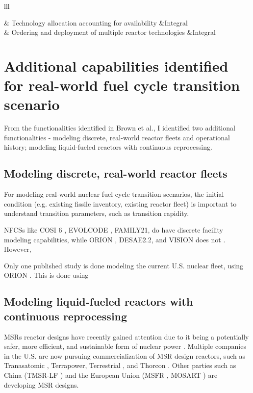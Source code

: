 \begin{table}[h]
\begin{tabular}{lll}
        \hline

         & Technology allocation accounting for availability &Integral \\
        	& Ordering and deployment of multiple reactor technologies &Integral \\
        \hline
    \end{tabular}
\end{table}

\section{Additional capabilities identified for real-world fuel cycle transition scenario}
From the functionalities identified in Brown et al., I identified two additional functionalities -
modeling discrete, real-world reactor fleets and operational history; modeling liquid-fueled
reactors with continuous reprocessing.

\subsection{Modeling discrete, real-world reactor fleets}
For modeling real-world nuclear fuel cycle transition scenarios, the initial
condition (e.g. existing fissile inventory, existing reactor fleet) is important
to understand transition parameters, such as transition rapidity.

\glspl{NFCS} like COSI 6 \cite{meyer_new_2009}, EVOLCODE \cite{alvaerz-velarde_validation_2014},
FAMILY21,
do have discrete facility modeling capabilities, while ORION \cite{},
DESAE2.2\cite{tsibulskiy_desae_2006}, and VISION \cite{jacobson_verifiable_2010} does not \cite{boucher_international_2010}.
However,

Only one published study is done modeling the current U.S. nuclear fleet,
using ORION \cite{sunny_transition_2015}. This is done using 





\subsection{Modeling liquid-fueled reactors with continuous reprocessing}
\glspl{MSR} reactor designs have recently gained attention due to it being a
potentially safer, more efficient, and sustainable form of nuclear power
\cite{serp_molten_2014}. Multiple companies in the U.S. are now pursuing
commercialization of \gls{MSR} design reactors, such as Tranasatomic \cite{transatomic_technical_2016}
, Terrapower, Terrestrial \cite{leblanc_18-_2017}, and
Thorcon \cite{dolan_19-_2017}. Other parties such as China (TMSR-LF \cite{dai_17-_2017}) 
and the European Union (MSFR \cite{heuer_towards_2014}, MOSART \cite{ignatiev_molten_2014})
are developing \gls{MSR} designs.

